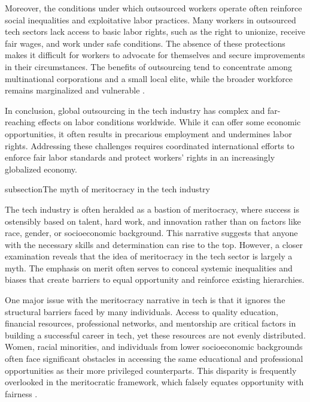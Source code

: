 \begin{refsection}
Moreover, the conditions under which outsourced workers operate often reinforce social inequalities and exploitative labor practices. Many workers in outsourced tech sectors lack access to basic labor rights, such as the right to unionize, receive fair wages, and work under safe conditions. The absence of these protections makes it difficult for workers to advocate for themselves and secure improvements in their circumstances. The benefits of outsourcing tend to concentrate among multinational corporations and a small local elite, while the broader workforce remains marginalized and vulnerable \cite[pp.~11-14]{sassen2014expulsions}.

In conclusion, global outsourcing in the tech industry has complex and far-reaching effects on labor conditions worldwide. While it can offer some economic opportunities, it often results in precarious employment and undermines labor rights. Addressing these challenges requires coordinated international efforts to enforce fair labor standards and protect workers' rights in an increasingly globalized economy.

subsection{The myth of meritocracy in the tech industry}

The tech industry is often heralded as a bastion of meritocracy, where success is ostensibly based on talent, hard work, and innovation rather than on factors like race, gender, or socioeconomic background. This narrative suggests that anyone with the necessary skills and determination can rise to the top. However, a closer examination reveals that the idea of meritocracy in the tech sector is largely a myth. The emphasis on merit often serves to conceal systemic inequalities and biases that create barriers to equal opportunity and reinforce existing hierarchies.

One major issue with the meritocracy narrative in tech is that it ignores the structural barriers faced by many individuals. Access to quality education, financial resources, professional networks, and mentorship are critical factors in building a successful career in tech, yet these resources are not evenly distributed. Women, racial minorities, and individuals from lower socioeconomic backgrounds often face significant obstacles in accessing the same educational and professional opportunities as their more privileged counterparts. This disparity is frequently overlooked in the meritocratic framework, which falsely equates opportunity with fairness \cite[pp.~543-548]{castilla2008gender}.


\end{refsection}
